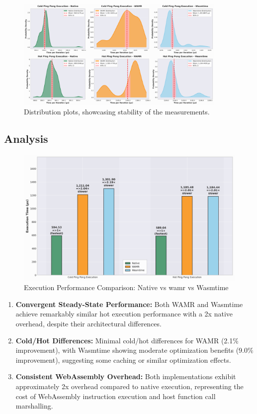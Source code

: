 \begin{figure}[h]
    \centering
    \includegraphics[width=0.9\textwidth]{images/execution-distribution}
    \caption{Distribution plots, showcasing stability of the measurements.}
    \label{fig:wasm-execution-distribution}
\end{figure}

\subsection{Analysis}

\begin{figure}[h]
    \centering
    \includegraphics[width=1.0\textwidth]{images/wasm-execution-rel}
    \caption{Execution Performance Comparison: Native vs \acrshort{wamr} vs Wasmtime}
    \label{fig:wasm-execution-relative}
\end{figure}

\begin{enumerate}
    \item \textbf{Convergent Steady-State Performance:} Both WAMR and Wasmtime achieve remarkably similar hot execution performance with a 2x native overhead, despite their architectural differences.
    
    \item \textbf{Cold/Hot Differences:} Minimal cold/hot differences for WAMR (2.1\% improvement), with Wasmtime showing moderate optimization benefits (9.0\% improvement), suggesting some caching or similar optimization effects.
    
    \item \textbf{Consistent WebAssembly Overhead:} Both implementations exhibit approximately 2x overhead compared to native execution, representing the cost of WebAssembly instruction execution and host function call marshalling.
\end{enumerate}

